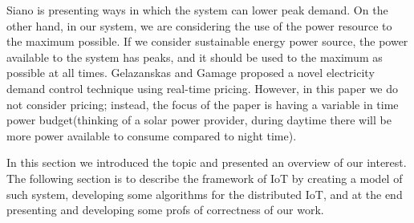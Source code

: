 \documentclass[../main/IoT.tex]{subfiles}
\begin{document}
Siano \cite{siano2014demand} is presenting ways in which the system can lower peak demand. On the other hand, in our system, we are considering the use of the power resource to the maximum possible. If we consider sustainable energy power source, the power available to the system has peaks, and it should be used to the maximum as possible at all times. Gelazanskas and Gamage \cite{gelazanskas2013demand} proposed a novel electricity demand control technique using real-time pricing. However, in this paper we do not consider pricing; instead, the focus of the paper is having a variable in time power budget(thinking of a solar power provider, during daytime there will be more power available to consume compared to night time).

In this section we introduced the topic and presented an overview of our interest. The following section is to describe the framework of IoT by creating a model of such system, developing some algorithms for the distributed IoT, and at the end presenting and developing some profs of correctness of our work.
\end{document}
